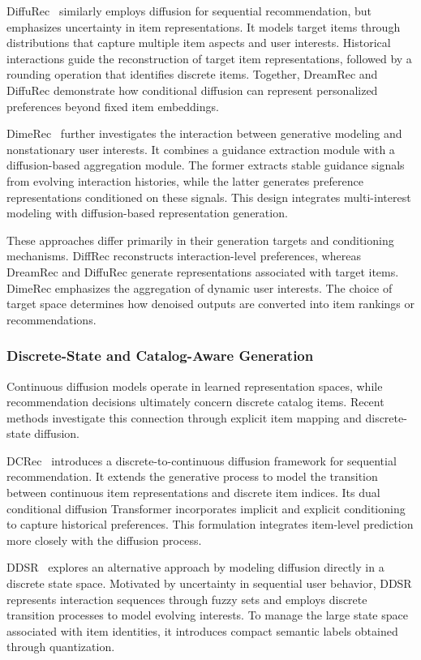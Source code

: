 \documentclass[sigconf,nonacm]{acmart}
\begin{document}
DiffuRec~\cite{diffurec} similarly employs diffusion
for sequential recommendation, but emphasizes
uncertainty in item representations. It models
target items through distributions that capture
multiple item aspects and user interests.
Historical interactions guide the reconstruction
of target item representations, followed by a
rounding operation that identifies discrete items.
Together, DreamRec and DiffuRec demonstrate how
conditional diffusion can represent personalized
preferences beyond fixed item embeddings.

DimeRec~\cite{dime} further investigates the
interaction between generative modeling and
nonstationary user interests. It combines a
guidance extraction module with a diffusion-based
aggregation module. The former extracts stable
guidance signals from evolving interaction
histories, while the latter generates preference
representations conditioned on these signals.
This design integrates multi-interest modeling
with diffusion-based representation generation.

These approaches differ primarily in their
generation targets and conditioning mechanisms.
DiffRec reconstructs interaction-level preferences,
whereas DreamRec and DiffuRec generate
representations associated with target items.
DimeRec emphasizes the aggregation of dynamic
user interests. The choice of target space
determines how denoised outputs are converted
into item rankings or recommendations.

\subsubsection{Discrete-State and Catalog-Aware Generation}

Continuous diffusion models operate in learned
representation spaces, while recommendation
decisions ultimately concern discrete catalog
items. Recent methods investigate this connection
through explicit item mapping and discrete-state
diffusion.

DCRec~\cite{dcrec} introduces a discrete-to-continuous
diffusion framework for sequential recommendation.
It extends the generative process to model the
transition between continuous item representations
and discrete item indices. Its dual conditional
diffusion Transformer incorporates implicit and
explicit conditioning to capture historical
preferences. This formulation integrates
item-level prediction more closely with the
diffusion process.

DDSR~\cite{ddsr} explores an alternative approach
by modeling diffusion directly in a discrete
state space. Motivated by uncertainty in
sequential user behavior, DDSR represents
interaction sequences through fuzzy sets and
employs discrete transition processes to
model evolving interests. To manage the large
state space associated with item identities,
it introduces compact semantic labels obtained
through quantization.
\end{document}
